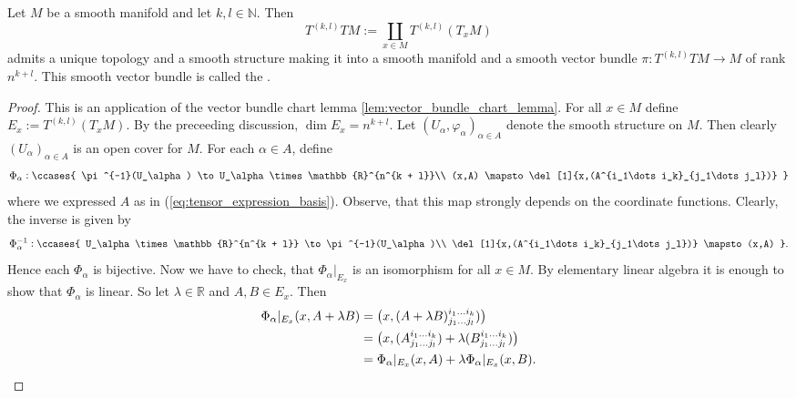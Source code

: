 \begin{proposition}
	\label{prop:tensor_bundle}
	Let $M$ be a smooth manifold and let $k,l \in \mathbb{N}$. Then
	\begin{equation*}
		T^{(k,l)}TM := \coprod_{x \in M} T^{(k,l)}(T_xM)
	\end{equation*}
	\noindent admits a unique topology and a smooth structure making it into a smooth manifold and a smooth vector bundle $\pi : T^{(k,l)}TM \to M$ of rank $n^{k + l}$. This smooth vector bundle is called the . 
\end{proposition}

\begin{proof}
	This is an application of the vector bundle chart lemma \ref{lem:vector_bundle_chart_lemma}. For all $x \in M$ define $E_x := T^{(k,l)}(T_xM)$. By the preceeding discussion, $\dim E_x = n^{k + l}$. Let $(U_\alpha,\varphi_\alpha)_{\alpha \in A}$ denote the smooth structure on $M$. Then clearly $(U_\alpha)_{\alpha \in A}$ is an open cover for $M$. For each $\alpha \in A$, define
\begin{equation*}
	\Phi_\alpha:\ccases{
		\pi^{-1}(U_\alpha) \to U_\alpha \times \mathbb{R}^{n^{k + l}}\\
		(x,A) \mapsto \del[1]{x,(A^{i_1\dots i_k}_{j_1\dots j_l})}
	}
\end{equation*}
\noindent where we expressed $A$ as in (\ref{eq:tensor_expression_basis}). Observe, that this map strongly depends on the coordinate functions. Clearly, the inverse is given by
\begin{equation*}
	\Phi^{-1}_\alpha:\ccases{
		U_\alpha \times\mathbb{R}^{n^{k + l}} \to \pi^{-1}(U_\alpha)\\
		\del[1]{x,(A^{i_1\dots i_k}_{j_1\dots j_l})} \mapsto (x,A)
	}.
\end{equation*}
	Hence each $\Phi_\alpha$ is bijective. Now we have to check, that $\Phi_\alpha\vert_{E_x}$ is an isomorphism for all $x \in M$. By elementary linear algebra it is enough to show that $\Phi_\alpha$ is linear. So let $\lambda \in \mathbb{R}$ and $A,B \in E_x$. Then
	\begin{align*}
		\Phi_\alpha\vert_{E_x}(x,A + \lambda B) &= \del[1]{x,(A + \lambda B)^{i_1\dots i_k}_{j_1\dots j_l})}\\
		&= \del[1]{x,(A^{i_1\dots i_k}_{j_1\dots j_l}) + \lambda (B^{i_1\dots i_k}_{j_1\dots j_l})}\\
		&= \Phi_\alpha\vert_{E_x}(x,A) + \lambda\Phi_\alpha\vert_{E_x}(x,B).
	\end{align*}

\end{proof}
